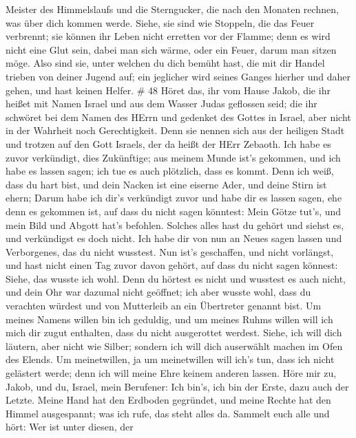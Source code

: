 Meister des Himmelslaufs und die Sterngucker, die nach den Monaten
rechnen, was über dich kommen werde.  Siehe, sie sind wie
Stoppeln, die das Feuer verbrennt; sie können ihr Leben nicht erretten
vor der Flamme; denn es wird nicht eine Glut sein, dabei man sich wärme,
oder ein Feuer, darum man sitzen möge.  Also sind sie,
unter welchen du dich bemüht hast, die mit dir Handel trieben von deiner
Jugend auf; ein jeglicher wird seines Ganges hierher und daher gehen,
und hast keinen Helfer. \# 48  Höret das, ihr vom Hause
Jakob, die ihr heißet mit Namen Israel und aus dem Wasser Judas
geflossen seid; die ihr schwöret bei dem Namen des HErrn und gedenket
des Gottes in Israel, aber nicht in der Wahrheit noch Gerechtigkeit.
 Denn sie nennen sich aus der heiligen Stadt und trotzen auf
den Gott Israels, der da heißt der HErr Zebaoth.  Ich habe
es zuvor verkündigt, dies Zukünftige; aus meinem Munde ist's gekommen,
und ich habe es lassen sagen; ich tue es auch plötzlich, dass es kommt.
 Denn ich weiß, dass du hart bist, und dein Nacken ist eine
eiserne Ader, und deine Stirn ist ehern;  Darum habe ich
dir's verkündigt zuvor und habe dir es lassen sagen, ehe denn es
gekommen ist, auf dass du nicht sagen könntest: Mein Götze tut's, und
mein Bild und Abgott hat's befohlen.  Solches alles hast du
gehört und siehst es, und verkündigst es doch nicht. Ich habe dir von
nun an Neues sagen lassen und Verborgenes, das du nicht wusstest.
 Nun ist's geschaffen, und nicht vorlängst, und hast nicht
einen Tag zuvor davon gehört, auf dass du nicht sagen könnest: Siehe,
das wusste ich wohl.  Denn du hörtest es nicht und wusstest
es auch nicht, und dein Ohr war dazumal nicht geöffnet; ich aber wusste
wohl, dass du verachten würdest und von Mutterleib an ein Übertreter
genannt bist.  Um meines Namens willen bin ich geduldig, und
um meines Ruhms willen will ich mich dir zugut enthalten, dass du nicht
ausgerottet werdest.  Siehe, ich will dich läutern, aber
nicht wie Silber; sondern ich will dich auserwählt machen im Ofen des
Elends.  Um meinetwillen, ja um meinetwillen will ich's
tun, dass ich nicht gelästert werde; denn ich will meine Ehre keinem
anderen lassen.  Höre mir zu, Jakob, und du, Israel, mein
Berufener: Ich bin's, ich bin der Erste, dazu auch der Letzte.
 Meine Hand hat den Erdboden gegründet, und meine Rechte
hat den Himmel ausgespannt; was ich rufe, das steht alles da.
 Sammelt euch alle und hört: Wer ist unter diesen, der

